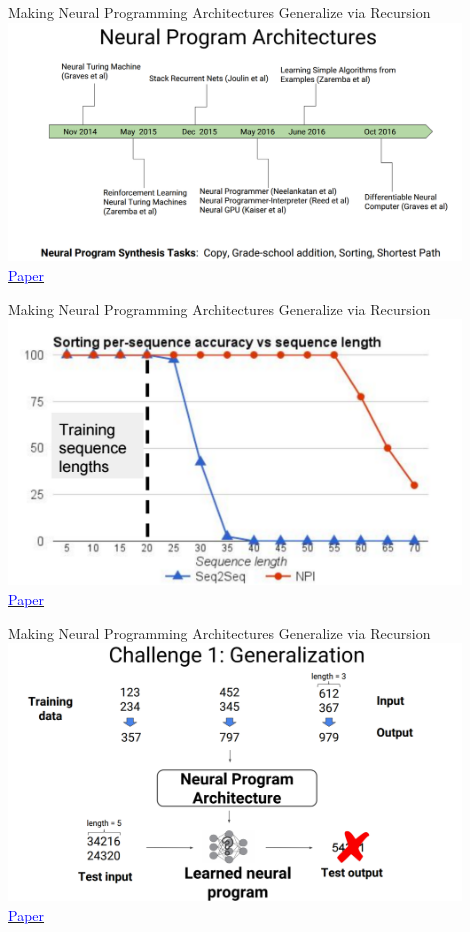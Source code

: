\documentclass[]{beamer}
\begin{document}
\begin{frame}{Making Neural Programming Architectures Generalize via Recursion}
\centering
\includegraphics[width=0.9\textwidth]{figures/cai-np-architectures} \\
\href{https://openreview.net/forum?id=BkbY4psgg&noteId=BkbY4psgg}{\textcolor{blue}{Paper}}
\end{frame}

\begin{frame}{Making Neural Programming Architectures Generalize via Recursion}
\centering
\includegraphics[width=0.9\textwidth]{figures/cai-npi-failure} \\
\href{https://openreview.net/forum?id=BkbY4psgg&noteId=BkbY4psgg}{\textcolor{blue}{Paper}}
\end{frame}

\begin{frame}{Making Neural Programming Architectures Generalize via Recursion}
\centering
\includegraphics[width=0.9\textwidth]{figures/cai-challenge-generalization} \\
\href{https://openreview.net/forum?id=BkbY4psgg&noteId=BkbY4psgg}{\textcolor{blue}{Paper}}
\end{frame}
\end{document}
